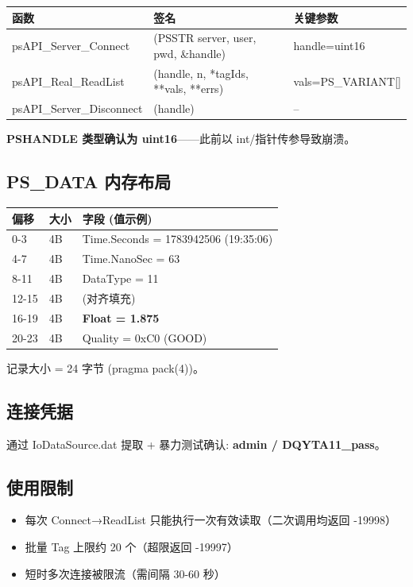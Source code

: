 \documentclass[12pt,a4paper]{ctexart}
\begin{document}
\begin{table}[H]\centering
\begin{tabular}{lll}
\toprule
\textbf{函数} & \textbf{签名} & \textbf{关键参数} \\
\midrule
psAPI\_Server\_Connect & (PSSTR server, user, pwd, \&handle) & handle=uint16 \\
psAPI\_Real\_ReadList & (handle, n, *tagIds, **vals, **errs) & vals=PS\_VARIANT[] \\
psAPI\_Server\_Disconnect & (handle) & -- \\
\bottomrule
\end{tabular}
\end{table}

\textbf{PSHANDLE 类型确认为 uint16}——此前以 int/指针传参导致崩溃。

\subsection{PS\_DATA 内存布局}

\begin{table}[H]\centering
\begin{tabular}{lll}
\toprule
\textbf{偏移} & \textbf{大小} & \textbf{字段 (值示例)} \\
\midrule
0-3 & 4B & Time.Seconds = 1783942506 (19:35:06) \\
4-7 & 4B & Time.NanoSec = 63 \\
8-11 & 4B & DataType = 11 \\
12-15 & 4B & (对齐填充) \\
16-19 & 4B & \textbf{Float = 1.875} \\
20-23 & 4B & Quality = 0xC0 (GOOD) \\
\bottomrule
\end{tabular}
\end{table}

记录大小 = 24 字节 (pragma pack(4))。

\subsection{连接凭据}
通过 IoDataSource.dat 提取 + 暴力测试确认: \textbf{admin / DQYTA11\_pass}。

\subsection{使用限制}
\begin{itemize}[leftmargin=*]
  \item 每次 Connect→ReadList 只能执行一次有效读取（二次调用均返回 -19998）
  \item 批量 Tag 上限约 20 个（超限返回 -19997）
  \item 短时多次连接被限流（需间隔 30-60 秒）
\end{itemize}
\end{document}
